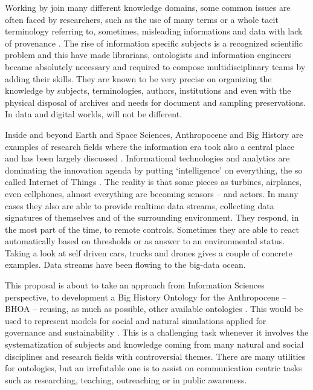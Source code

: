 \documentclass[
	12pt, %
	a4paper, %
	oneside, %
	headinclude, footinclude, %
	BCOR5mm, %
]{scrartcl}
\begin{document}
Working by join many different knowledge domains, some common issues are often faced by researchers, such as the use of many terms or a whole tacit terminology referring to, sometimes, misleading informations and data with lack of provenance \citep{lebo_prov-o:_2013,ma_capturing_2014}. The rise of information specific subjects is a recognized scientific problem \citep{fox_rise_2012} and this have made librarians, ontologists and information engineers became absolutely necessary and required to compose multidisciplinary teams by adding their skills. They are known to be very precise on organizing the knowledge by subjects, terminologies, authors, institutions and even with the physical disposal of archives and needs for document and sampling preservations. In data and digital worlds, will not be different.

Inside and beyond Earth and Space Sciences, Anthropocene and Big History are examples of research fields where the information era took also a central place and has been largely discussed \citep{baker_egy:_2009}. Informational technologies and analytics are dominating the innovation agenda by putting `intelligence' on everything, the so called Internet of Things \citep{kopetz_internet_2011}. The reality is that some pieces as turbines, airplanes, even cellphones, almost everything are becoming sensors -- and actors. In many cases they also are able to provide realtime data streams, collecting data signatures of themselves and of the surrounding environment. They respond, in the most part of the time, to remote controls. Sometimes they are able to react automatically based on thresholds or as answer to an environmental status. Taking a look at self driven cars, trucks and drones gives a couple of concrete examples. Data streams have been flowing to the big-data ocean.

This proposal is about to take an approach from Information Sciences perspective, to development a Big History Ontology for the Anthropocene -- BHOA -- reusing, as much as possible, other available ontologies \citep{hobbs_ontology_2004,cox_formal_2005,raskin_knowledge_2005,cox_geologic_2015,cox_time_2016}. This would be used to represent models for social and natural simulations \citep{pitt_interleaving_2011} applied for governance and sustainability \citep{patterson_exploring_2016}. This is a challenging task whenever it involves the systematization of subjects and knowledge coming from many natural and social disciplines and research fields with controversial themes. There are many utilities for ontologies, but an irrefutable one is to assist on communication centric tasks such as researching, teaching, outreaching or in public awareness.
\end{document}
